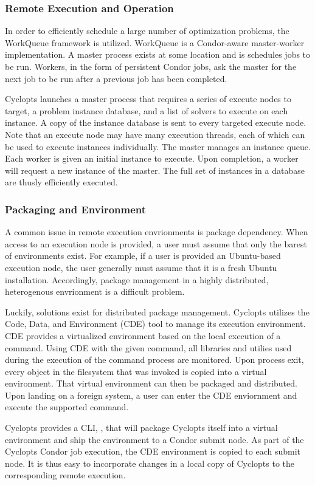 \subsubsection{Remote Execution and Operation}

In order to efficiently schedule a large number of optimization problems, the
WorkQueue framework \cite{bui_work_2011} is utilized. WorkQueue is a
Condor-aware master-worker implementation. A master process exists at some
location and is schedules jobs to be run. Workers, in the form of persistent
Condor jobs, ask the master for the next job to be run after a previous job has
been completed.

Cyclopts launches a master process that requires a series of execute nodes to
target, a problem instance database, and a list of solvers to execute on each
instance. A copy of the instance database is sent to every targeted execute
node. Note that an execute node may have many execution threads, each of which
can be used to execute instances individually. The master manages an instance
queue. Each worker is given an initial instance to execute. Upon completion, a
worker will request a new instance of the master. The full set of instances in a
database are thusly efficiently executed.

\subsubsection{Packaging and Environment}

A common issue in remote execution envrionments is package dependency. When
access to an execution node is provided, a user must assume that only the barest
of environments exist. For example, if a user is provided an Ubuntu-based
execution node, the user generally must assume that it is a fresh Ubuntu
installation. Accordingly, package management in a highly distributed,
heterogenous envrionment is a difficult problem.

Luckily, solutions exist for distributed package management. Cyclopts utilizes
the Code, Data, and Environment (CDE) \cite{cde} tool to manage its execution
environment. CDE provides a virtualized environment based on the local execution
of a command. Using CDE with the given command, all libraries and utilies used
during the execution of the command process are monitored. Upon process exit,
every object in the filesystem that was invoked is copied into a virtual
environment. That virtual environment can then be packaged and distributed. Upon
landing on a foreign system, a user can enter the CDE enviornment and execute
the supported command.

Cyclopts provides a CLI, , that will package Cyclopts itself
into a virtual environment and ship the environment to a Condor submit node. As
part of the Cyclopts Condor job execution, the CDE environment is copied to each
submit node. It is thus easy to incorporate changes in a local copy of Cyclopts
to the corresponding remote execution.
